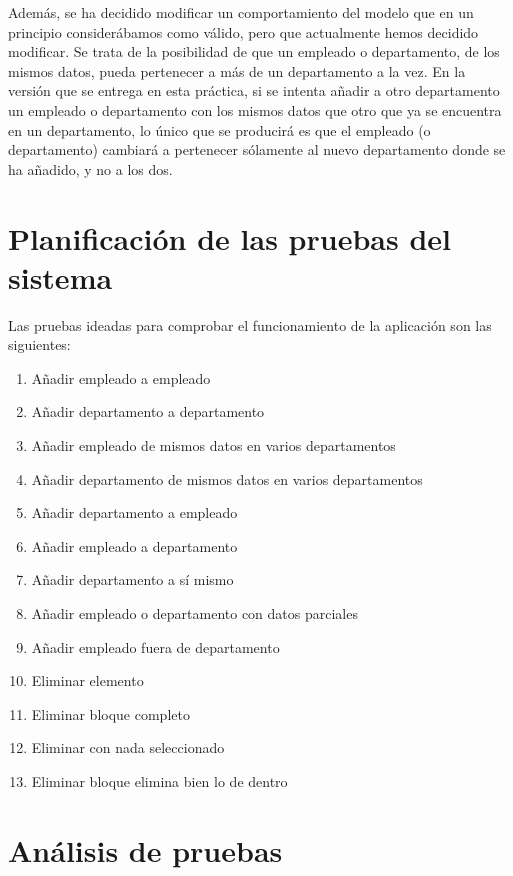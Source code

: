 \documentclass[openany]{article}
\begin{document}
Además, se ha decidido modificar un comportamiento del modelo que en un principio considerábamos como válido, pero que actualmente hemos decidido modificar. Se trata de la posibilidad de que un empleado o departamento, de los mismos datos, pueda pertenecer a más de un departamento a la vez. En la versión que se entrega en esta práctica, si se intenta añadir a otro departamento un empleado o departamento con los mismos datos que otro que ya se encuentra en un departamento, lo único que se producirá es que el empleado (o departamento) cambiará a pertenecer sólamente al nuevo departamento donde se ha añadido, y no a los dos.


\section{Planificación de las pruebas del sistema} \label{plan}

Las pruebas ideadas para comprobar el funcionamiento de la aplicación son las siguientes:

\begin{enumerate}
    \item Añadir empleado a empleado
    \item Añadir departamento a departamento
    \item Añadir empleado de mismos datos en varios departamentos
    \item Añadir departamento de mismos datos en varios departamentos
    \item Añadir departamento a empleado
    \item Añadir empleado a departamento
    \item Añadir departamento a sí mismo
    \item Añadir empleado o departamento con datos parciales
    \item Añadir empleado fuera de departamento
    \item Eliminar elemento
    \item Eliminar bloque completo
    \item Eliminar con nada seleccionado
    \item Eliminar bloque elimina bien lo de dentro
\end{enumerate}


\pagebreak
\section{Análisis de pruebas}\label{ana}
\end{document}
